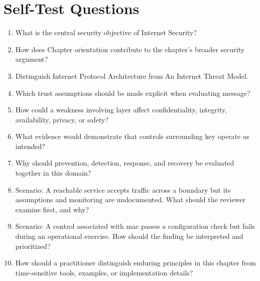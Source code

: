 \documentclass[11pt]{article}
\begin{document}
\section*{Self-Test Questions}
\begin{enumerate}
\item What is the central security objective of Internet Security?
\item How does Chapter orientation contribute to the chapter's broader security argument?
\item Distinguish Internet Protocol Architecture from An Internet Threat Model.
\item Which trust assumptions should be made explicit when evaluating message?
\item How could a weakness involving layer affect confidentiality, integrity, availability, privacy, or safety?
\item What evidence would demonstrate that controls surrounding key operate as intended?
\item Why should prevention, detection, response, and recovery be evaluated together in this domain?
\item Scenario: A reachable service accepts traffic across a boundary but its assumptions and monitoring are undocumented. What should the reviewer examine first, and why?
\item Scenario: A control associated with mac passes a configuration check but fails during an operational exercise. How should the finding be interpreted and prioritized?
\item How should a practitioner distinguish enduring principles in this chapter from time-sensitive tools, examples, or implementation details?
\end{enumerate}
\end{document}
